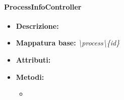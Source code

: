 \paragraph{ProcessInfoController}%
\begin{itemize}
	\item \textbf{Descrizione: } 
	\item \textbf{Mappatura base: } \textit{\textbackslash process\textbackslash \{id\}}
	\item \textbf{Attributi: }
	\item \textbf{Metodi: }\begin{itemize}
					\item 
				\end{itemize}
\end{itemize}